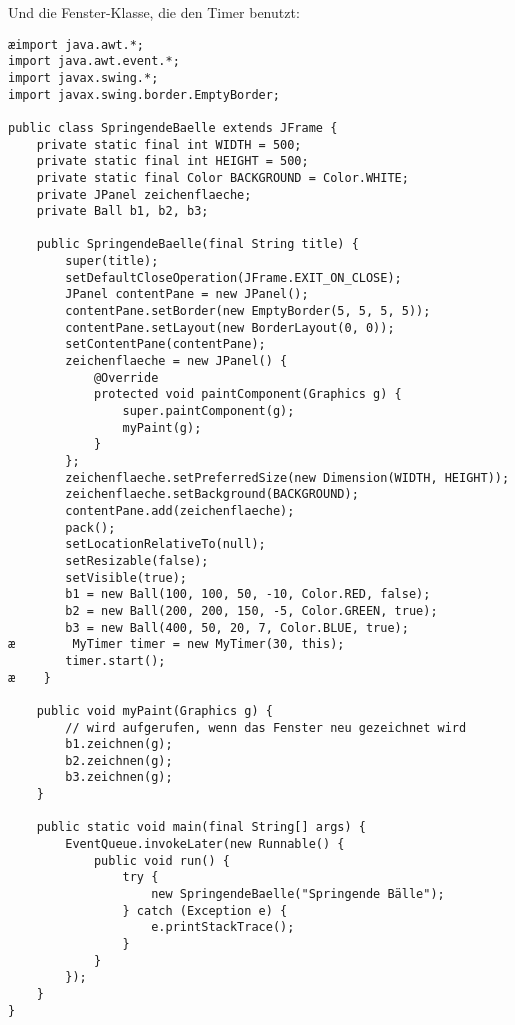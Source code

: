 Und die Fenster-Klasse, die den Timer benutzt:

\begin{lstlisting}
æimport java.awt.*;
import java.awt.event.*;
import javax.swing.*;
import javax.swing.border.EmptyBorder;

public class SpringendeBaelle extends JFrame {
    private static final int WIDTH = 500;
    private static final int HEIGHT = 500;
    private static final Color BACKGROUND = Color.WHITE;
    private JPanel zeichenflaeche;
    private Ball b1, b2, b3;

    public SpringendeBaelle(final String title) {
        super(title);
        setDefaultCloseOperation(JFrame.EXIT_ON_CLOSE);
        JPanel contentPane = new JPanel();
        contentPane.setBorder(new EmptyBorder(5, 5, 5, 5));
        contentPane.setLayout(new BorderLayout(0, 0));
        setContentPane(contentPane);
        zeichenflaeche = new JPanel() {
            @Override
            protected void paintComponent(Graphics g) {
                super.paintComponent(g);
                myPaint(g);
            }
        };
        zeichenflaeche.setPreferredSize(new Dimension(WIDTH, HEIGHT));
        zeichenflaeche.setBackground(BACKGROUND);
        contentPane.add(zeichenflaeche);
        pack();
        setLocationRelativeTo(null);
        setResizable(false);
        setVisible(true);
        b1 = new Ball(100, 100, 50, -10, Color.RED, false);
        b2 = new Ball(200, 200, 150, -5, Color.GREEN, true);
        b3 = new Ball(400, 50, 20, 7, Color.BLUE, true);
æ        MyTimer timer = new MyTimer(30, this);
        timer.start();
æ    }
	
    public void myPaint(Graphics g) {
        // wird aufgerufen, wenn das Fenster neu gezeichnet wird
        b1.zeichnen(g);
        b2.zeichnen(g);
        b3.zeichnen(g);
    }

    public static void main(final String[] args) {
        EventQueue.invokeLater(new Runnable() {
            public void run() {
                try {
                    new SpringendeBaelle("Springende Bälle");
                } catch (Exception e) {
                    e.printStackTrace();
                }
            }
        });
    }
}
\end{lstlisting} 